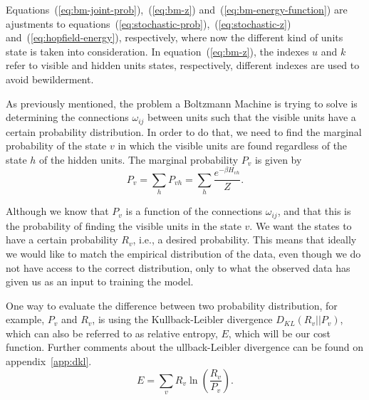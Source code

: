 Equations~(\ref{eq:bm-joint-prob}),~(\ref{eq:bm-z}) and~(\ref{eq:bm-energy-function}) are ajustments to equations~(\ref{eq:stochastic-prob}),~(\ref{eq:stochastic-z}) and~(\ref{eq:hopfield-energy}), respectively, where now the different kind of units state is taken into consideration. 
In equation~(\ref{eq:bm-z}), the indexes $u$ and $k$ refer to visible and hidden units states, respectively, different indexes are used to avoid bewilderment.

As previously mentioned, the problem a Boltzmann Machine is trying to solve is determining the connections $\omega_{ij}$ between units such that the visible units have a certain probability distribution. 
In order to do that, we need to find the marginal probability of the state $v$ in which the visible units are found regardless of the state $h$ of the hidden units. The marginal probability $P_{v}$ is given by
\begin{equation}
  \label{eq:bm-marginal-prob}
  P_{v} = \sum_{h} P_{vh} = \sum_{h} \frac{e^{-\beta H_{vh}}}{Z}.
\end{equation}

Although we know that $P_{v}$ is a function of the connections $\omega_{ij}$, and that this is the probability of finding the visible units in the state $v$. We want the states to have a certain probability $R_{v}$, i.e., a desired probability.
This means that ideally we would like to match the empirical distribution of the data, even though we do not have access to the correct distribution, only to what the observed data has given us as an input to training the model.

One way to evaluate the difference between two probability distribution, for example, $P_{v}$ and $R_{v}$, is using the Kullback-Leibler divergence $D_{KL}(R_{v}||P_{v})$, which can also be referred to as relative entropy, $E$, which will be our cost function. 
Further comments about the ullback-Leibler divergence can be found on appendix~\ref{app:dkl}.
\begin{equation}
  \label{eq:relative-entropy}
  E = \sum_{v} R_{v} \ln{\left(\frac{R_{v}}{P_{v}}\right)}.
\end{equation}

